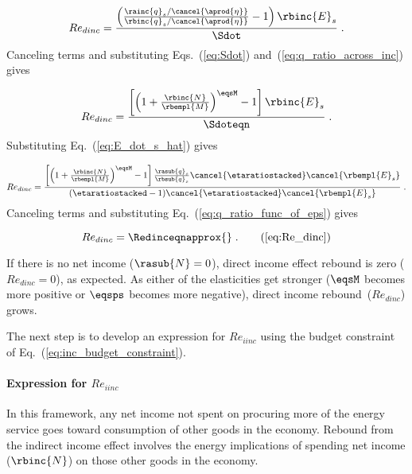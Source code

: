 \begin{equation}
  Re_{dinc} = \frac{\left( \frac{\rainc{q}_s / \cancel{\aprod{\eta}}}{\rbinc{q}_s / \cancel{\aprod{\eta}}} - 1  \right) \rbinc{E}_s} 
              {\Sdot} \; .
\end{equation}
%
Canceling terms and substituting Eqs.~(\ref{eq:Sdot}) and~(\ref{eq:q_ratio_across_inc}) gives

\begin{equation}
  Re_{dinc} = \frac{\left[ \left( 1 + \frac{\rbinc{N}}{\rbempl{M}} \right) ^{\eqsM} - 1  \right] \rbinc{E}_s} 
              {\Sdoteqn} \; .
\end{equation}
%
Substituting Eq.~(\ref{eq:E_dot_s_hat}) gives

\begin{equation}
  Re_{dinc} = \frac{\left[ \left( 1 + \frac{\rbinc{N}}{\rbempl{M}} \right) ^{\eqsM} - 1  \right] 
                  \frac{\rasub{q}_s}{\rbsub{q}_s}
                \cancel{\etaratiostacked}
                \cancel{\rbempl{E}_s}}
              {\left( \etaratiostacked - 1 \right)\! \cancel{\etaratiostacked} \cancel{\rbempl{E}_s}} \; .
\end{equation}
%
Canceling terms and substituting Eq.~(\ref{eq:q_ratio_func_of_eps}) gives

\begin{equation} 
  Re_{dinc} = \Redinceqnapprox{} \; . \tag{\ref{eq:Re_dinc}}
\end{equation}

If there is no net income ($\rasub{N} = 0$), 
direct income effect rebound is zero ($Re_{dinc} = 0$), as expected.
As either of the elasticities get stronger 
($\eqsM$ becomes more positive or $\eqsps$ becomes more negative), 
direct income rebound~($Re_{dinc}$) grows.

The next step is to develop an expression for $Re_{iinc}$
using the budget constraint of Eq.~(\ref{eq:inc_budget_constraint}).

\paragraph{Expression for $Re_{iinc}$}
\label{sec:Re_iinc}

In this framework,
any net income not spent on procuring more of the energy service
goes toward consumption of other goods in the economy.
Rebound from the indirect income effect involves 
the energy implications of spending net income ($\rbinc{N}$)
on those other goods in the economy.

